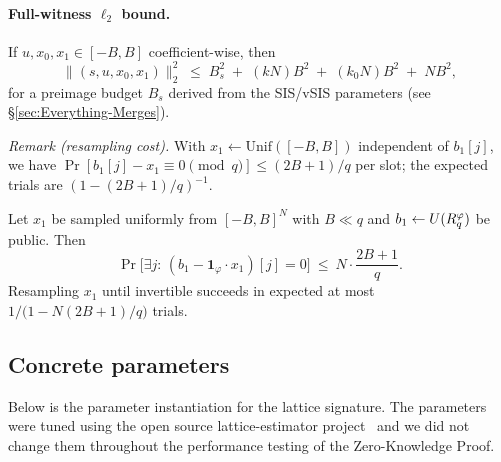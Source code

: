 \paragraph{Full-witness $\ell_2$ bound.}
If $u,x_0,x_1\in[-B,B]$ coefficient-wise, then
\[
\|(s,u,x_0,x_1)\|_2^2\;\le\; B_s^2\; +\; (kN)B^2\; +\; (k_0N)B^2\; +\; N B^2,
\]
for a preimage budget $B_s$ derived from the SIS/vSIS parameters (see \S\ref{sec:Everything-Merges}).

\noindent\emph{Remark (resampling cost).}
With $x_1 \gets \mathrm{Unif}([{-}B,B])$ independent of $b_1[j]$, we have $\Pr[b_1[j]-x_1\equiv 0 \pmod q] \le (2B{+}1)/q$ per slot; the expected trials are $(1-(2B{+}1)/q)^{-1}$.

\begin{lemma}\label{lem:invertibility-resampling}
Let $x_1$ be sampled uniformly from $[-B,B]^N$ with $B\ll q$ and $b_1\leftarrow U(R_q^\varphi)$ be public. Then
\[
\Pr\big[\exists j:\,(b_1-\mathbf{1}_\varphi\cdot x_1)[j]=0\big]\ \le\ N\cdot\frac{2B+1}{q}.
\]
Resampling $x_1$ until invertible succeeds in expected at most $1/\big(1- N(2B{+}1)/q\big)$ trials.
\end{lemma}

\subsection{Concrete parameters}

Below is the parameter instantiation for the lattice signature. The parameters were tuned using the open source lattice-estimator project~\cite{albrecht-player-scott-2015} and we did not change them throughout the performance testing of the Zero-Knowledge Proof.

